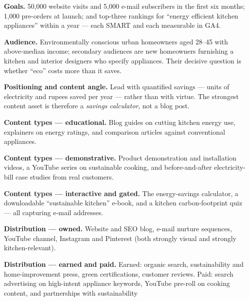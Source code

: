 \begin{qlist}
\begin{apts}
\item \textbf{Goals.} 50{,}000 website visits and 5{,}000 e-mail subscribers in
      the first six months; 1{,}000 pre-orders at launch; and top-three
      rankings for ``energy efficient kitchen appliances'' within a year --- each
      SMART and each measurable in GA4.
\item \textbf{Audience.} Environmentally conscious urban homeowners aged 28--45
      with above-median income; secondary audiences are new homeowners
      furnishing a kitchen and interior designers who specify appliances. Their
      decisive question is whether ``eco'' costs more than it saves.
\item \textbf{Positioning and content angle.} Lead with quantified savings ---
      units of electricity and rupees saved per year --- rather than with virtue.
      The strongest content asset is therefore a \emph{savings calculator}, not
      a blog post.
\item \textbf{Content types --- educational.} Blog guides on cutting kitchen
      energy use, explainers on energy ratings, and comparison articles against
      conventional appliances.
\item \textbf{Content types --- demonstrative.} Product demonstration and
      installation videos, a YouTube series on sustainable cooking, and
      before-and-after electricity-bill case studies from real customers.
\item \textbf{Content types --- interactive and gated.} The energy-savings
      calculator, a downloadable ``sustainable kitchen'' e-book, and a kitchen
      carbon-footprint quiz --- all capturing e-mail addresses.
\item \textbf{Distribution --- owned.} Website and SEO blog, e-mail nurture
      sequences, YouTube channel, Instagram and Pinterest (both strongly visual
      and strongly kitchen-relevant).
\item \textbf{Distribution --- earned and paid.} Earned: organic search,
      sustainability and home-improvement press, green certifications, customer
      reviews. Paid: search advertising on high-intent appliance keywords,
      YouTube pre-roll on cooking content, and partnerships with sustainability

\end{apts}
\end{qlist}
